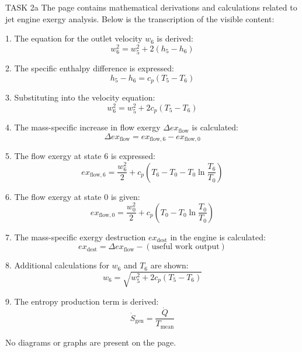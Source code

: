 TASK 2a  
The page contains mathematical derivations and calculations related to jet engine exergy analysis. Below is the transcription of the visible content:

1. The equation for the outlet velocity \( w_6 \) is derived:
\[
w_6^2 = w_5^2 + 2 \left( h_5 - h_6 \right)
\]

2. The specific enthalpy difference is expressed:
\[
h_5 - h_6 = c_p \left( T_5 - T_6 \right)
\]

3. Substituting into the velocity equation:
\[
w_6^2 = w_5^2 + 2 c_p \left( T_5 - T_6 \right)
\]

4. The mass-specific increase in flow exergy \( \Delta ex_{\text{flow}} \) is calculated:
\[
\Delta ex_{\text{flow}} = ex_{\text{flow},6} - ex_{\text{flow},0}
\]

5. The flow exergy at state 6 is expressed:
\[
ex_{\text{flow},6} = \frac{w_6^2}{2} + c_p \left( T_6 - T_0 - T_0 \ln \frac{T_6}{T_0} \right)
\]

6. The flow exergy at state 0 is given:
\[
ex_{\text{flow},0} = \frac{w_0^2}{2} + c_p \left( T_0 - T_0 \ln \frac{T_0}{T_0} \right)
\]

7. The mass-specific exergy destruction \( ex_{\text{dest}} \) in the engine is calculated:
\[
ex_{\text{dest}} = \Delta ex_{\text{flow}} - \left( \text{useful work output} \right)
\]

8. Additional calculations for \( w_6 \) and \( T_6 \) are shown:
\[
w_6 = \sqrt{w_5^2 + 2 c_p \left( T_5 - T_6 \right)}
\]

9. The entropy production term is derived:
\[
\dot{S}_{\text{gen}} = \frac{\dot{Q}}{T_{\text{mean}}}
\]

No diagrams or graphs are present on the page.  

